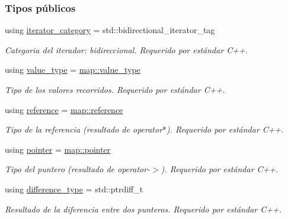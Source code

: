\subsubsection*{Tipos públicos}
\begin{DoxyCompactItemize}
\item 
using \hyperlink{classaed2_1_1iterator_1_1iterator_ad98a0b33afe1df977c248314251fe2b2_ad98a0b33afe1df977c248314251fe2b2}{iterator\+\_\+category} = std\+::bidirectional\+\_\+iterator\+\_\+tag
\begin{DoxyCompactList}\small\item\em Categoria del iterador\+: bidireccional. Requerido por estándar C++. \end{DoxyCompactList}\item 
using \hyperlink{classaed2_1_1iterator_1_1iterator_a10ed10b6d144d04ae127ef846e1d4e7c_a10ed10b6d144d04ae127ef846e1d4e7c}{value\+\_\+type} = \hyperlink{classaed2_1_1map_a719db98e0ff9a837610f76be33264680_a719db98e0ff9a837610f76be33264680}{map\+::value\+\_\+type}
\begin{DoxyCompactList}\small\item\em Tipo de los valores recorridos. Requerido por estándar C++. \end{DoxyCompactList}\item 
using \hyperlink{classaed2_1_1iterator_1_1iterator_a91be74b60dfc3eabfa5a69d9aa068959_a91be74b60dfc3eabfa5a69d9aa068959}{reference} = \hyperlink{classaed2_1_1map_af4f147533b3c0207ab036c86ce13ec0d_af4f147533b3c0207ab036c86ce13ec0d}{map\+::reference}
\begin{DoxyCompactList}\small\item\em Tipo de la referencia (resultado de operator$\ast$). Requerido por estándar C++. \end{DoxyCompactList}\item 
using \hyperlink{classaed2_1_1iterator_1_1iterator_add8c8243f6b0e3cb7b67ce06757df53b_add8c8243f6b0e3cb7b67ce06757df53b}{pointer} = \hyperlink{classaed2_1_1map_a7394e98a23b86bc008ad73326b273fd5_a7394e98a23b86bc008ad73326b273fd5}{map\+::pointer}
\begin{DoxyCompactList}\small\item\em Tipo del puntero (resultado de operator-\/$>$). Requerido por estándar C++. \end{DoxyCompactList}\item 
using \hyperlink{classaed2_1_1iterator_1_1iterator_a7dc57879d054ca0168a20003c9d655b6_a7dc57879d054ca0168a20003c9d655b6}{difference\+\_\+type} = std\+::ptrdiff\+\_\+t
\begin{DoxyCompactList}\small\item\em Resultado de la diferencia entre dos punteros. Requerido por estándar C++. \end{DoxyCompactList}\end{DoxyCompactItemize}
